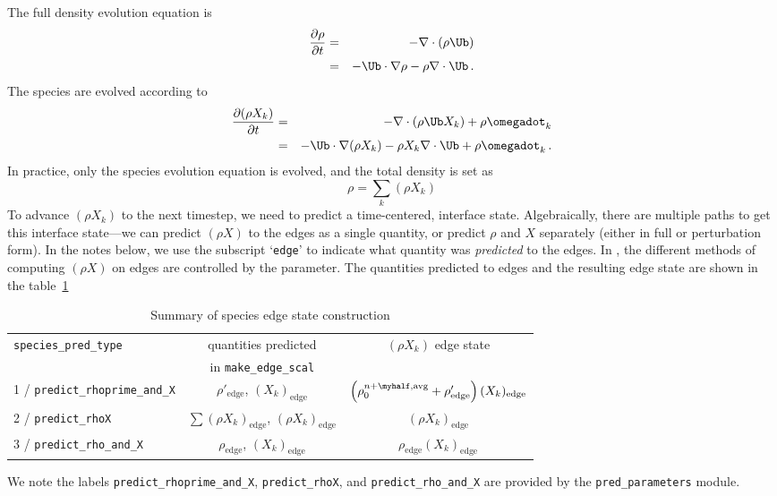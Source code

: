 The full density evolution equation is
\begin{eqnarray}
\frac{\partial\rho}{\partial t} &=& -\nabla\cdot(\rho\Ub) \nonumber \\
&=& -\Ub\cdot\nabla\rho - \rho\nabla\cdot\Ub \, . \label{rho equation}
\end{eqnarray}
The species are evolved according to
\begin{eqnarray}
\frac{\partial(\rho X_k)}{\partial t} &=& -\nabla\cdot(\rho\Ub X_k) + \rho \omegadot_k \nonumber \\
&=& -\Ub\cdot\nabla(\rho X_k) - \rho X_k \nabla\cdot\Ub + \rho \omegadot_k \, . \label{species equation}
\end{eqnarray}
In practice, only the species evolution equation is evolved, and the
total density is set as
\begin{equation}
\rho = \sum_k (\rho X_k)
\end{equation}
To advance $(\rho X_k)$ to the next timestep, we need to predict a
time-centered, interface state.  Algebraically, there are multiple
paths to get this interface state---we can predict $(\rho X)$ to the
edges as a single quantity, or predict $\rho$ and $X$ separately
(either in full or perturbation form).  In the notes below, we use the
subscript `{\tt edge}' to indicate what quantity was {\em predicted} to the
edges.  In \maestro, the different methods of computing $(\rho X)$ on
edges are controlled by the  parameter.  The
quantities predicted to edges and the 
resulting edge state are shown in the table~\ref{table:pred:species}

\begin{table}[h]
\centering
\caption{Summary of species edge state construction}
\label{table:pred:species}
\renewcommand{\arraystretch}{1.5}
\begin{tabular}{l|c|c}
\hline
\hline
{\tt species\_pred\_type} &   {quantities predicted} & {$(\rho X_k)$ edge state} \\[-5pt]
 & {in {\tt make\_edge\_scal}} & \\
\hline 
1 / {\tt predict\_rhoprime\_and\_X}  &  
  $\rho'_\mathrm{edge}$, $(X_k)_\mathrm{edge}$ &
  $\left(\rho_0^{n+\myhalf,{\rm avg}}  
  + \rho'_\mathrm{edge} \right)(X_k)_\mathrm{edge}$ \\
2 / {\tt predict\_rhoX}  &  
  $\sum(\rho X_k)_\mathrm{edge}$, $(\rho X_k)_\mathrm{edge}$ &
  $(\rho X_k)_\mathrm{edge}$ \\
3 / {\tt predict\_rho\_and\_X}  &  
  $\rho_\mathrm{edge}$, $(X_k)_\mathrm{edge}$ &
  $\rho_\mathrm{edge} (X_k)_\mathrm{edge}$ \\
\hline
\end{tabular}
\end{table}
We note the labels {\tt predict\_rhoprime\_and\_X}, {\tt predict\_rhoX}, and
{\tt predict\_rho\_and\_X} are provided by the {\tt pred\_parameters}
module.




